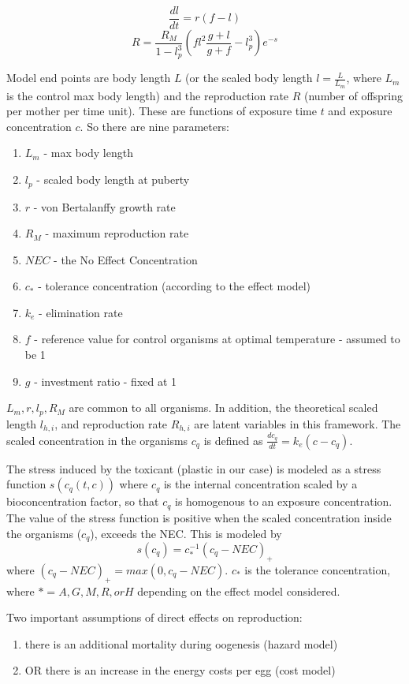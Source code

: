 \documentclass[
]{article}
\providecommand{\tightlist}{%
  \setlength{\itemsep}{0pt}\setlength{\parskip}{0pt}}
\begin{document}
\[ \frac{dl}{dt} = r(f-l)\]
\[ R = \frac{R_M}{1-l^3_p}\left(fl^2\frac{g + l}{g + f}-l^3_p\right)e^{-s}\]

Model end points are body length \(L\) (or the scaled body length
\(l = \frac{L}{L_m}\), where \(L_m\) is the control max body length) and
the reproduction rate \(R\) (number of offspring per mother per time
unit). These are functions of exposure time \(t\) and exposure
concentration \(c\). So there are nine parameters:

\begin{enumerate}
\def\labelenumi{\arabic{enumi}.}
\tightlist
\item
  \(L_m\) - max body length
\item
  \(l_p\) - scaled body length at puberty
\item
  \(r\) - von Bertalanffy growth rate
\item
  \(R_M\) - maximum reproduction rate
\item
  \(NEC\) - the No Effect Concentration
\item
  \(c_*\) - tolerance concentration (according to the effect model)
\item
  \(k_e\) - elimination rate
\item
  \(f\) - reference value for control organisms at optimal temperature -
  assumed to be 1
\item
  \(g\) - investment ratio - fixed at 1
\end{enumerate}

\(L_m, r, l_p, R_M\) are common to all organisms. In addition, the
theoretical scaled length \(l_{h,i}\), and reproduction rate \(R_{h,i}\)
are latent variables in this framework. The scaled concentration in the
organisms \(c_{q}\) is defined as \(\frac{dc_q}{dt} = k_e(c-c_q)\).

The stress induced by the toxicant (plastic in our case) is modeled as a
stress function \(s(c_q(t,c))\) where \(c_q\) is the internal
concentration scaled by a bioconcentration factor, so that \(c_q\) is
homogenous to an exposure concentration. The value of the stress
function is positive when the scaled concentration inside the organisms
(\(c_q\)), exceeds the NEC. This is modeled by
\[s(c_q) = c^{-1}_* (c_q - NEC)_+\] where
\((c_q-NEC)_+ = max(0, c_q - NEC)\). \(c_*\) is the tolerance
concentration, where \(* = A, G, M, R, or H\) depending on the effect
model considered.

Two important assumptions of direct effects on reproduction:

\begin{enumerate}
\def\labelenumi{\arabic{enumi}.}
\tightlist
\item
  there is an additional mortality during oogenesis (hazard model)
\item
  OR there is an increase in the energy costs per egg (cost model)
\end{enumerate}
\end{document}

